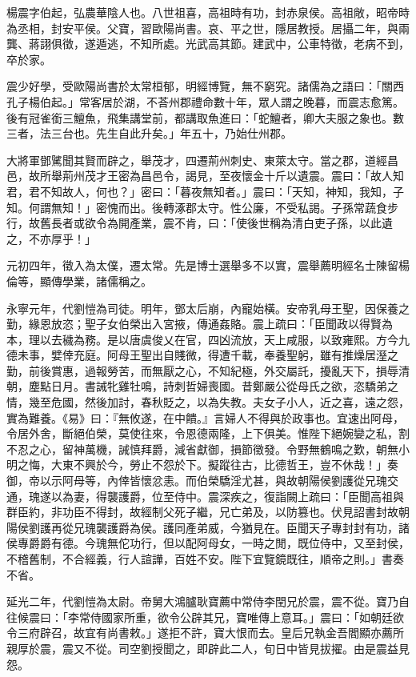 
\begin{pinyinscope}
楊震字伯起，弘農華陰人也。八世祖喜，高祖時有功，封赤泉侯。高祖敞，昭帝時為丞相，封安平侯。父寶，習歐陽尚書。哀、平之世，隱居教授。居攝二年，與兩龔、蔣詡俱徵，遂遁逃，不知所處。光武高其節。建武中，公車特徵，老病不到，卒於家。

震少好學，受歐陽尚書於太常桓郁，明經博覽，無不窮究。諸儒為之語曰：「關西孔子楊伯起。」常客居於湖，不荅州郡禮命數十年，眾人謂之晚暮，而震志愈篤。後有冠雀銜三鱣魚，飛集講堂前，都講取魚進曰：「蛇鱣者，卿大夫服之象也。數三者，法三台也。先生自此升矣。」年五十，乃始仕州郡。

大將軍鄧騭聞其賢而辟之，舉茂才，四遷荊州刺史、東萊太守。當之郡，道經昌邑，故所舉荊州茂才王密為昌邑令，謁見，至夜懷金十斤以遺震。震曰：「故人知君，君不知故人，何也？」密曰：「暮夜無知者。」震曰：「天知，神知，我知，子知。何謂無知！」密愧而出。後轉涿郡太守。性公廉，不受私謁。子孫常蔬食步行，故舊長者或欲令為開產業，震不肯，曰：「使後世稱為清白吏子孫，以此遺之，不亦厚乎！」

元初四年，徵入為太僕，遷太常。先是博士選舉多不以實，震舉薦明經名士陳留楊倫等，顯傳學業，諸儒稱之。

永寧元年，代劉愷為司徒。明年，鄧太后崩，內寵始橫。安帝乳母王聖，因保養之勤，緣恩放恣；聖子女伯榮出入宮掖，傳通姦賂。震上疏曰：「臣聞政以得賢為本，理以去穢為務。是以唐虞俊乂在官，四凶流放，天上咸服，以致雍熙。方今九德未事，嬖倖充庭。阿母王聖出自賤微，得遭千載，奉養聖躬，雖有推燥居溼之勤，前後賞惠，過報勞苦，而無厭之心，不知紀極，外交屬託，擾亂天下，損辱清朝，塵點日月。書誡牝雞牡鳴，詩刺哲婦喪國。昔鄭嚴公從母氏之欲，恣驕弟之情，幾至危國，然後加討，春秋貶之，以為失教。夫女子小人，近之喜，遠之怨，實為難養。《易》曰：『無攸遂，在中饋。』言婦人不得與於政事也。宜速出阿母，令居外舍，斷絕伯榮，莫使往來，令恩德兩隆，上下俱美。惟陛下絕婉孌之私，割不忍之心，留神萬機，誡慎拜爵，減省獻御，損節徵發。令野無鶴鳴之歎，朝無小明之悔，大東不興於今，勞止不怨於下。擬蹤往古，比德哲王，豈不休哉！」奏御，帝以示阿母等，內倖皆懷忿恚。而伯榮驕淫尤甚，與故朝陽侯劉護從兄瑰交通，瑰遂以為妻，得襲護爵，位至侍中。震深疾之，復詣闕上疏曰：「臣聞高祖與群臣約，非功臣不得封，故經制父死子繼，兄亡弟及，以防篡也。伏見詔書封故朝陽侯劉護再從兄瑰襲護爵為侯。護同產弟威，今猶見在。臣聞天子專封封有功，諸侯專爵爵有德。今瑰無佗功行，但以配阿母女，一時之閒，既位侍中，又至封侯，不稽舊制，不合經義，行人諠譁，百姓不安。陛下宜覽鏡既往，順帝之則。」書奏不省。

延光二年，代劉愷為太尉。帝舅大鴻臚耿寶薦中常侍李閏兄於震，震不從。寶乃自往候震曰：「李常侍國家所重，欲令公辟其兄，寶唯傳上意耳。」震曰：「如朝廷欲令三府辟召，故宜有尚書敕。」遂拒不許，寶大恨而去。皇后兄執金吾閻顯亦薦所親厚於震，震又不從。司空劉授聞之，即辟此二人，旬日中皆見拔擢。由是震益見怨。


\end{pinyinscope}
